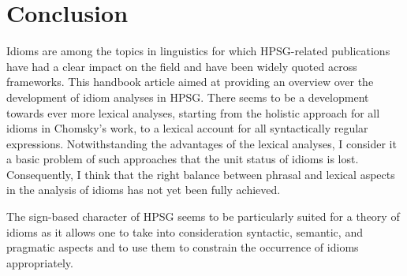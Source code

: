 \documentclass[output=paper
                ,modfonts
                ,nonflat
	        ,collection
	        ,collectionchapter
	        ,collectiontoclongg
 	        ,biblatex
                ,babelshorthands
                ,newtxmath
                ,draftmode
                ,colorlinks, citecolor=brown
]{./langsci/langscibook}
\begin{document}

\section{Conclusion}
\label{Sec-Summary}

Idioms are among the topics in linguistics for which HPSG-related publications have had a clear impact on the field and have been widely quoted across frameworks.
This handbook article aimed at providing an overview over the development of idiom analyses in HPSG. 
There seems to be a development towards ever more lexical analyses, starting from the holistic approach for all idioms in Chomsky's work, to a lexical account for all syntactically regular expressions. 
Notwithstanding the advantages of the lexical analyses, 
I consider it a basic problem of such approaches that the unit status of idioms is lost. Consequently, I think that the right balance between phrasal and lexical aspects in the analysis of idioms has not yet been fully achieved.

The sign-based character of HPSG seems to be particularly suited for a theory of idioms as it allows one to take into consideration syntactic, semantic, and pragmatic aspects and to use them to constrain the occurrence of idioms appropriately.
\end{document}
